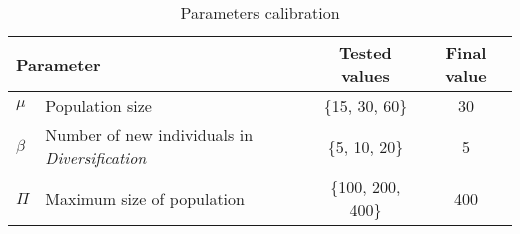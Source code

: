 \begin{table}[]
\centering
\begin{tabular}{@{}llcc@{}}
\toprule
\multicolumn{2}{l}{Parameter}                                                                                                    & Tested values   & Final value \\ \midrule
$\mu$         & Population size                                                                                                  & \{15, 30, 60\}    & 30               \\
$\beta$       & Number of new individuals in \textit{Diversification}                                                                     & \{5, 10, 20\}     & 5                \\
$\Pi$ & Maximum size of population                                                                                       & \{100, 200, 400\} & 400              \\  \bottomrule
\end{tabular}
\caption{Parameters calibration}
\label{calibration}
\end{table}